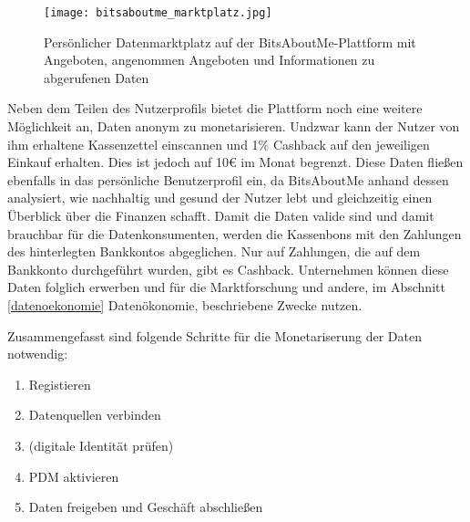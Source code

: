 \begin{figure}[!ht]
	\centering
	\texttt{[image: bitsaboutme\_marktplatz.jpg]}
	\caption{Persönlicher Datenmarktplatz auf der BitsAboutMe-Plattform mit Angeboten, angenommen Angeboten und Informationen zu abgerufenen Daten}
	\label{fig:bitsaboutmeMarktplatz}
\end{figure}
\FloatBarrier

\noindent Neben dem Teilen des Nutzerprofils bietet die Plattform noch eine weitere Möglichkeit an, Daten anonym zu monetarisieren. Undzwar kann der Nutzer von ihm erhaltene Kassenzettel einscannen und 1\% Cashback auf den jeweiligen Einkauf erhalten. Dies ist jedoch auf 10€ im Monat begrenzt. Diese Daten fließen ebenfalls in das persönliche Benutzerprofil ein, da BitsAboutMe anhand dessen analysiert, wie nachhaltig und gesund der Nutzer lebt und gleichzeitig einen Überblick über die Finanzen schafft. Damit die Daten valide sind und damit brauchbar für die Datenkonsumenten, werden die Kassenbons mit den Zahlungen des hinterlegten Bankkontos abgeglichen. Nur auf Zahlungen, die auf dem Bankkonto durchgeführt wurden, gibt es Cashback. Unternehmen können diese Daten folglich erwerben und für die Marktforschung und andere, im Abschnitt \ref{datenoekonomie} Datenökonomie, beschriebene Zwecke nutzen. \newline

\noindent Zusammengefasst sind folgende Schritte für die Monetariserung der Daten notwendig:
\begin{enumerate}
	\item Registieren
	\item Datenquellen verbinden
	\item (digitale Identität prüfen)
	\item PDM aktivieren
	\item Daten freigeben und Geschäft abschließen
\end{enumerate}